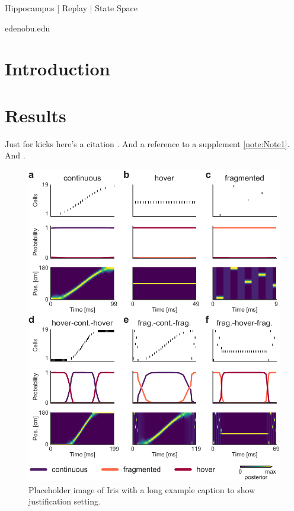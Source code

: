 \documentclass[times, twoside, watermark]{zHenriquesLab-StyleBioRxiv}
\begin{document}
\begin{keywords}
Hippocampus | Replay | State Space
\end{keywords}

\begin{corrauthor}
edeno\at bu.edu
\end{corrauthor}

\section*{Introduction}
\Blindtext

\section*{Results}

Just for kicks here's a citation \cite{Gustafsson2016}. And a reference to a supplement \cref{note:Note1}. And .
\Blindtext

\begin{figure}%
\centering
\includegraphics[width=.8\linewidth]{figures/Figure2.pdf}
\caption{Placeholder image of Iris with a long example caption to show justification setting.}
\label{fig:computerNo}
\end{figure}

\Blindtext
\end{document}
